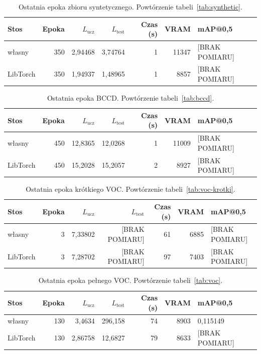 \begin{table}[ht]
\centering
\caption{Ostatnia epoka zbioru syntetycznego. Powtórzenie tabeli~\ref{tab:synthetic}.}
\label{tab:zal-synthetic}
\small
\begin{tabular}{lrrrrrl}
\toprule
Stos & Epoka & \(L_{\mathrm{ucz}}\) & \(L_{\mathrm{test}}\) & Czas (s) & VRAM & mAP@0,5 \\
\midrule
własny & 350 & 2{,}94468 & 3{,}74764 & 1 & 11347 & [BRAK POMIARU] \\
LibTorch & 350 & 1{,}94937 & 1{,}48965 & 1 & 8857 & [BRAK POMIARU] \\
\bottomrule
\end{tabular}
\end{table}

\begin{table}[ht]
\centering
\caption{Ostatnia epoka BCCD. Powtórzenie tabeli~\ref{tab:bccd}.}
\label{tab:zal-bccd}
\small
\begin{tabular}{lrrrrrl}
\toprule
Stos & Epoka & \(L_{\mathrm{ucz}}\) & \(L_{\mathrm{test}}\) & Czas (s) & VRAM & mAP@0,5 \\
\midrule
własny & 450 & 12{,}8365 & 12{,}0268 & 1 & 11009 & [BRAK POMIARU] \\
LibTorch & 450 & 15{,}2028 & 15{,}2057 & 2 & 8927 & [BRAK POMIARU] \\
\bottomrule
\end{tabular}
\end{table}

\begin{table}[ht]
\centering
\caption{Ostatnia epoka krótkiego VOC. Powtórzenie tabeli~\ref{tab:voc-krotki}.}
\label{tab:zal-voc-krotki}
\small
\begin{tabular}{lrrrrrl}
\toprule
Stos & Epoka & \(L_{\mathrm{ucz}}\) & \(L_{\mathrm{test}}\) & Czas (s) & VRAM & mAP@0,5 \\
\midrule
własny & 3 & 7{,}33802 & [BRAK POMIARU] & 61 & 6885 & [BRAK POMIARU] \\
LibTorch & 3 & 7{,}28702 & [BRAK POMIARU] & 97 & 7403 & [BRAK POMIARU] \\
\bottomrule
\end{tabular}
\end{table}

\begin{table}[ht]
\centering
\caption{Ostatnia epoka pełnego VOC. Powtórzenie tabeli~\ref{tab:voc}.}
\label{tab:zal-voc}
\small
\begin{tabular}{lrrrrrl}
\toprule
Stos & Epoka & \(L_{\mathrm{ucz}}\) & \(L_{\mathrm{test}}\) & Czas (s) & VRAM & mAP@0,5 \\
\midrule
własny & 130 & 3{,}4634 & 296{,}158 & 74 & 8903 & 0{,}115149 \\
LibTorch & 130 & 2{,}86758 & 12{,}6827 & 79 & 8633 & [BRAK POMIARU] \\
\bottomrule
\end{tabular}
\end{table}
